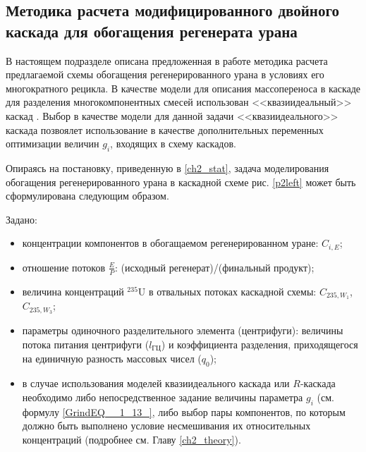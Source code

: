 
\subsection{Методика расчета модифицированного двойного каскада для обогащения регенерата урана}\label{statement}

В настоящем подразделе описана предложенная в работе методика расчета предлагаемой схемы обогащения регенерированного урана в условиях его многократного рецикла. В качестве модели для описания массопереноса в каскаде для разделения многокомпонентных смесей использован <<квазиидеальный>> каскад \cite{sazykinKvaziidealnyeKaskadyDlya2000}. Выбор в качестве модели для данной задачи <<квазиидеального>> каскада позвоялет использование в качестве дополнительных переменных оптимизации величин $g_{i}$, входящих в схему каскадов. 


Опираясь на постановку, приведенную в \ref{ch2_stat}, задача моделирования обогащения регенерированного урана в каскадной схеме рис. \ref{p2left} может быть сформулирована следующим образом.

Задано:

\begin{itemize}
    \item концентрации компонентов в обогащаемом регенерированном уране: $C_{i,{E}}$; 
    \item отношение потоков $\frac{E}{P}$: (исходный регенерат)/(финальный продукт);
    \item величина концентраций $^{235}$U в отвальных потоках каскадной схемы: $C_{235,{W_1}}$, $C_{235,{W_3}}$;
    \item параметры одиночного разделительного элемента (центрифуги): величины потока питания центрифуги ($l_\textit{ГЦ}$) и коэффициента разделения, приходящегося на единичную разность массовых чисел ($q_{0}$);
    \item в случае использования моделей квазиидеального каскада или $R$-каскада необходимо либо непосредственное задание величины параметра $g_i$ (см. формулу \ref{GrindEQ__1_13_}, либо выбор пары компонентов, по которым должно быть выполнено условие несмешивания их относительных концентраций (подробнее см. Главу \ref{ch2_theory}).
\end{itemize}

